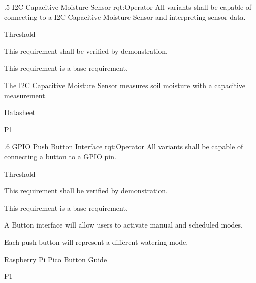 \ONERQMTVKPP
{\RqtNumberBase.5}
{I2C Capacitive Moisture Sensor}
{rqt:Operator}
{All \ThisSys variants shall be capable of connecting to a I2C Capacitive Moisture Sensor and interpreting sensor data.}
{
	\item [All Phases] Threshold
}
{This requirement shall be verified by demonstration.}
{
	\item [N/A] This requirement is a base requirement.
}
{
  \item The I2C Capacitive Moisture Sensor measures soil moisture with a capacitive measurement. 
  \item \href{https://learn.adafruit.com/adafruit-stemma-soil-sensor-i2c-capacitive-moisture-sensor}{Datasheet}
}
{P1}

\ONERQMTVKPP
{\RqtNumberBase.6}
{GPIO Push Button Interface}
{rqt:Operator}
{All \ThisSys variants shall be capable of connecting a button to a GPIO pin.}
{
	\item [All Phases] Threshold
}
{This requirement shall be verified by demonstration.}
{
	\item [N/A] This requirement is a base requirement.
}
{
  \item A Button interface will allow \ThisSystem users to activate manual and scheduled modes.
  \item Each push button will represent a different watering mode.
  \item \href{https://projects.raspberrypi.org/en/projects/introduction-to-the-pico/10}{Raspberry Pi Pico Button Guide}
}
{P1}

